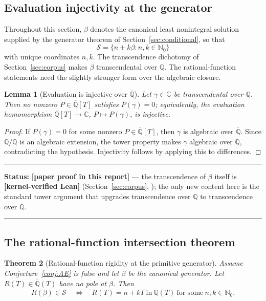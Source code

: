 \documentclass[11pt,oneside]{article}
\newtheorem{theorem}{Theorem}[section]
\newtheorem{lemma}[theorem]{Lemma}
\theoremstyle{definition}
\theoremstyle{remark}
\newcommand{\Nzero}{\mathbb N_0}
\newcommand{\Q}{\mathbb Q}
\newcommand{\C}{\mathbb C}
\newcommand{\Abar}{\overline{\mathbb Q}}
\newcommand{\Sol}{\mathcal S}
\newcommand{\lean}[1]{\texttt{\detokenize{#1}}}
\newcommand{\statuslean}{\textcolor{leanblue}{\textbf{[kernel-verified Lean]}}}
\newcommand{\statusnew}{\textcolor{newgreen}{\textbf{[paper proof in this report]}}}
\newenvironment{statusbox}[1]
{\begin{center}\begin{minipage}{0.94\textwidth}\raggedright\hbadness=10000\hrule
\vspace{0.45em}\textbf{Status:} #1\par\vspace{0.35em}}
{\vspace{0.35em}\hrule\end{minipage}\end{center}}
\begin{document}
\subsection{Evaluation injectivity at the generator}

Throughout this section, $\beta$ denotes the canonical least nonintegral solution supplied by
the generator theorem of Section~\ref{sec:conditional}, so that
\[
 \Sol=\{n+k\beta:n,k\in\Nzero\}
\]
with unique coordinates $n,k$.  The transcendence dichotomy of Section~\ref{sec:corpus} makes
$\beta$ transcendental over $\Q$.  The rational-function statements need the slightly stronger
form over the algebraic closure.

\begin{lemma}[Evaluation is injective over $\Abar$]
\label{rr:lem-eval-inj}
Let $\gamma\in\C$ be transcendental over $\Q$.  Then no nonzero $P\in\Abar[T]$ satisfies
$P(\gamma)=0$; equivalently, the evaluation homomorphism
$\Abar[T]\to\C$, $P\mapsto P(\gamma)$, is injective.
\end{lemma}

\begin{proof}
If $P(\gamma)=0$ for some nonzero $P\in\Abar[T]$, then $\gamma$ is algebraic over $\Abar$.
Since $\Abar/\Q$ is an algebraic extension, the tower property makes $\gamma$ algebraic over
$\Q$, contradicting the hypothesis.  Injectivity follows by applying this to differences.
\end{proof}

\begin{statusbox}{\statusnew{} --- the transcendence of $\beta$ itself is \statuslean{}
(Section~\ref{sec:corpus}, \lean{Transcendence}); the only new content here is the standard
tower argument that upgrades transcendence over $\Q$ to transcendence over $\Abar$.}
\end{statusbox}

\subsection{The rational-function intersection theorem}

\begin{theorem}[Rational-function rigidity at the primitive generator]
\label{rr:thm-rational-rigidity}
Assume Conjecture~\ref{conj:AE} is false and let $\beta$ be the canonical generator.  Let
$R(T)\in\Abar(T)$ have no pole at $\beta$.  Then
\[
 \boxed{\quad
 R(\beta)\in\Sol
 \quad\Longleftrightarrow\quad
 R(T)=n+kT\ \text{in}\ \Abar(T)
 \ \text{for some}\ n,k\in\Nzero.
 \quad}
\]
\end{theorem}
\end{document}

